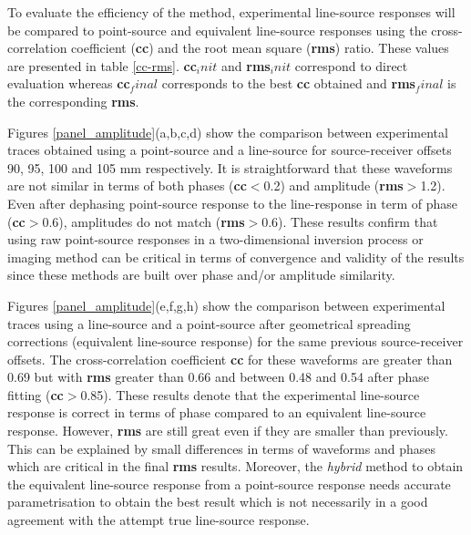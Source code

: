 \documentclass[manuscript,revised]{geophysics}
\begin{document}
\noindent To evaluate the efficiency of the method, experimental line-source responses will be compared to point-source and equivalent line-source responses using the cross-correlation coefficient (\textbf{cc}) and the root mean square (\textbf{rms}) ratio. These values are presented in table \ref{cc-rms}. \textbf{cc}$_init$ and \textbf{rms}$_init$ correspond to direct evaluation whereas \textbf{cc}$_final$ corresponds to the best \textbf{cc} obtained and \textbf{rms}$_final$ is the corresponding \textbf{rms}.

\noindent Figures \ref{panel_amplitude}(a,b,c,d) show the comparison between experimental traces obtained using a point-source and a line-source for source-receiver offsets 90, 95, 100 and 105 mm respectively. It is straightforward that these waveforms are not similar in terms of both phases (\textbf{cc}$<$0.2) and amplitude (\textbf{rms}$>$1.2). Even after dephasing point-source response to the line-response in term of phase (\textbf{cc}$>$0.6), amplitudes do not match (\textbf{rms}$>$0.6). These results confirm that using raw point-source responses in a two-dimensional inversion process or imaging method can be critical in terms of convergence and validity of the results since these methods are built over phase and/or amplitude similarity.

\noindent Figures \ref{panel_amplitude}(e,f,g,h) show the comparison between experimental traces using a line-source and a point-source after geometrical spreading corrections (equivalent line-source response) for the same previous source-receiver offsets. The cross-correlation coefficient \textbf{cc} for these waveforms are greater than 0.69 but with \textbf{rms} greater than 0.66 and between 0.48 and 0.54 after phase fitting (\textbf{cc}$>$0.85). These results denote that the experimental line-source response is correct in terms of phase compared to an equivalent line-source response. However, \textbf{rms} are still great even if they are smaller than previously. This can be explained by small differences in terms of waveforms and phases which are critical in the final \textbf{rms} results. Moreover, the \textit{hybrid} method to obtain the equivalent line-source response from a point-source response needs accurate parametrisation to obtain the best result which is not necessarily in a good agreement with the attempt true line-source response.   
\end{document}
